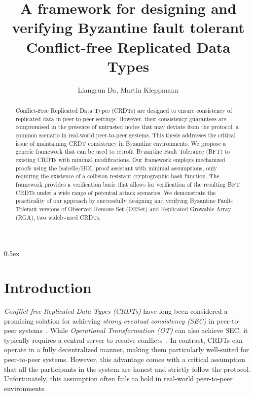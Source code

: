 \documentclass[11pt]{article}
\begin{document}
\title{A framework for designing and verifying Byzantine fault tolerant Conflict-free Replicated Data Types}
\author{Liangrun Da, Martin Kleppmann}
\maketitle

\begin{abstract}
Conflict-Free Replicated Data Types (CRDTs) are designed to ensure consistency of replicated data in peer-to-peer settings. However, their consistency guarantees are compromised in the presence of untrusted nodes that may deviate from the protocol, a common scenario in real-world peer-to-peer systems. This thesis addresses the critical issue of maintaining CRDT consistency in Byzantine environments. We propose a generic framework that can be used to retrofit Byzantine Fault Tolerance (BFT) to existing CRDTs with minimal modifications. Our framework employs mechanized proofs using the Isabelle/HOL proof assistant with minimal assumptions, only requiring the existence of a collision-resistant cryptographic hash function. The framework provides a verification basis that allows for verification of the resulting BFT CRDTs under a wide range of potential attack scenarios. We demonstrate the practicality of our approach by successfully designing and verifying Byzantine Fault-Tolerant versions of Observed-Remove Set (ORSet) and Replicated Growable Array (RGA), two widely-used CRDTs.
\end{abstract}

\tableofcontents

\parindent 0pt\parskip 0.5ex

\section {Introduction}
\emph{Conflict-free Replicated Data Types (CRDTs)} have long been considered a promising solution for achieving \emph{strong eventual consistency (SEC)} in peer-to-peer systems~\cite{shapiro2011conflict}. While \emph{Operational Transformation (OT)} can also achieve SEC, it typically requires a central server to resolve conflicts~\cite{nichols1995high, DayRichter:2010tt, Etherpad:2011um, Wang:2015vo}. In contrast, CRDTs can operate in a fully decentralized manner, making them particularly well-suited for peer-to-peer systems. However, this advantage comes with a critical assumption that all the participants in the system are honest and strictly follow the protocol. Unfortunately, this assumption often fails to hold in real-world peer-to-peer environments.
\end{document}
